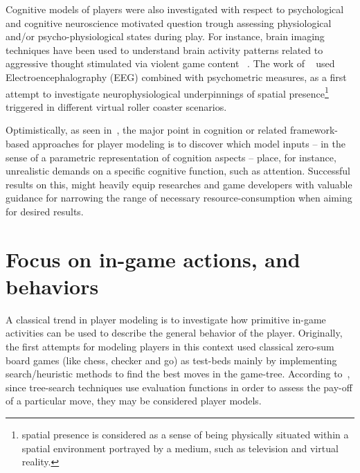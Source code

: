 Cognitive models of players were also investigated with respect to psychological and cognitive neuroscience motivated question trough assessing physiological and/or psycho-physiological states during play. For instance, brain imaging techniques have been used to understand brain activity patterns related to aggressive thought stimulated via violent game content ~\citep{weber_does_2006}. The work of ~\cite{baumgartner_neural_2006} used Electroencephalography (EEG) combined with psychometric measures, as a first attempt to investigate neurophysiological underpinnings of spatial presence\footnote{spatial presence is considered as a sense of being physically situated within a spatial environment portrayed by a medium, such as television and virtual reality.} triggered in different virtual roller coaster scenarios.

Optimistically, as seen in~\cite{bohil_cognitive_2007}, the major point in cognition or related framework-based approaches for player modeling is to discover which model inputs -- in the sense of a parametric representation of cognition aspects -- place, for instance, unrealistic demands on a specific cognitive function, such as attention. Successful results on this, might heavily equip researches and game developers with valuable guidance for narrowing the range of necessary resource-consumption when aiming for desired results.   

\section{Focus on in-game actions, and behaviors}\label{sec:in_game_action_reviews}
A classical trend in player modeling is to investigate how primitive in-game activities can be used to describe the general behavior of the player. Originally, the first attempts for modeling players in this context used classical zero-sum board games (like chess, checker and go) as test-beds mainly by implementing search/heuristic methods to find the best moves in the game-tree. According to~\cite{bakkes_player_2012}, since tree-search techniques use evaluation functions in order to assess the pay-off of a particular move, they may be considered player models.


